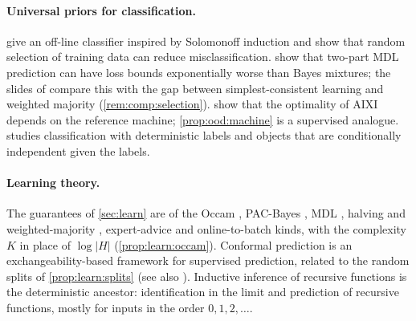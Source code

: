 \paragraph{Universal priors for classification.} \citet{lattimore2013nofree} give an off-line classifier inspired by Solomonoff induction and show that random selection of training data can reduce misclassification. \citet{poland2005asymptotics} show that two-part MDL prediction can have loss bounds exponentially worse than Bayes mixtures; the slides of \citet{vaintrobhanni2026nnbayes} compare this with the gap between simplest-consistent learning and weighted majority (\cref{rem:comp:selection}). \citet{leike2015bad} show that the optimality of AIXI depends on the reference machine; \cref{prop:ood:machine} is a supervised analogue. \citet{ryabko2006pattern} studies classification with deterministic labels and objects that are conditionally independent given the labels.

\paragraph{Learning theory.} The guarantees of \cref{sec:learn} are of the Occam \citep{blumer1987occam}, PAC-Bayes \citep{mcallester1999some}, MDL \citep{barron1991minimum,grunwald2007minimum}, halving and weighted-majority \citep{littlestone1988learning,littlestone1994weighted}, expert-advice \citep{vovk1990aggregating,cesabianchi2006prediction} and online-to-batch \citep{littlestone1989online,cesabianchi2004generalization} kinds, with the complexity $K$ in place of $\log|H|$ (\cref{prop:learn:occam}). Conformal prediction \citep{vovk2005algorithmic} is an exchangeability-based framework for supervised prediction, related to the random splits of \cref{prop:learn:splits} (see also \citealp{vovk1992universal}). Inductive inference of recursive functions \citep{gold1967language,barzdin1972prediction,case1983comparison} is the deterministic ancestor: identification in the limit and prediction of recursive functions, mostly for inputs in the order $0,1,2,\dots$.

